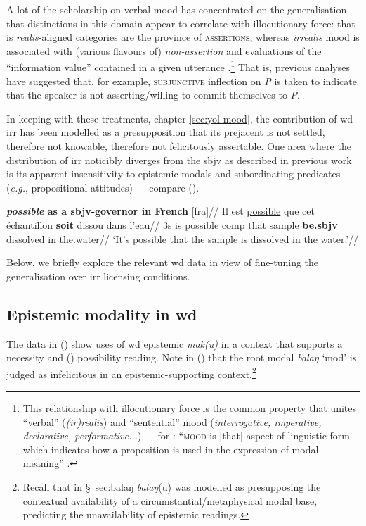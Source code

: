 A lot of the scholarship on verbal mood has concentrated on the generalisation that distinctions in this domain appear to correlate with illocutionary force: that is \textit{realis}-aligned categories are the province of \textsc{assertions}, whereas \textit{irrealis} mood is associated with (various flavours of) \textit{non-assertion} \citep[\textit{e.g.},][]{Bybee1995, Palmer2001} and evaluations of the ``information value'' contained in a given utterance \citep[\textit{e.g.},][]{Lunn1995}.\footnote{This relationship with illocutionary force is the common property that unites ``verbal'' (\textit{(ir)realis}) and ``sentential'' mood (\textit{interrogative, imperative, declarative, performative...}) --- for \citeauthor{Portner2018a}: ``\textsc{mood} is [that] aspect of linguistic form which indicates how a proposition is used in the expression of modal meaning'' \citeyearpar[4]{Portner2018a}.} That is, previous analyses have suggested that, for example, \textsc{subjunctive} inflection on \textit{P} is taken to indicate that the speaker is not asserting/willing to commit themselves to \textit{P}. 

In keeping with these treatments, chapter \ref{sec:yol-mood}, the contribution of \acrshort{wd} \gls{irr} has been modelled as a presupposition that its prejacent is not settled, therefore not knowable, therefore not felicitously assertable. One area where the distribution of \gls{irr} noticibly diverges from the \gls{sbjv} as described in previous work is its apparent insensitivity to epistemic modals and subordinating predicates (\textit{e.g.}, propositional attitudes) --- compare (\nextx).

\pex 
\begingl\glpreamble \textbf{\textit{possible} as a \gls{sbjv}-governor in French }[\gls{fra}]//
\gla Il est \ul{possible} que cet échantillon \textbf{soit} dissou dans l'eau//
\glb 3s is possible \gls{comp} that sample \textbf{be.\gls{sbjv}} dissolved in the.water//
\glft`It's possible that the sample is dissolved in the water.'//\endgl\xe


Below, we briefly explore the relevant \acrshort{wd} data in view of fine-tuning the generalisation over \gls{irr} licensing conditions. 


	\subsection{Epistemic modality in \gls{wd}}
	
	
	The data in (\nextx) show uses of \gls{wd} epistemic \textit{mak(u)} in a context that supports a  necessity and  () possibility reading. Note in () that the root modal \textit{balaŋ} `\gls{mod}' is judged as infelicitous in an epistemic-supporting context.\footnote{Recall that in \S~{sec:balaŋ} \textit{balaŋ}(u) was modelled as presupposing the contextual availability of a circumstantial/metaphysical modal base, predicting the unavailability of epistemic readings.}
	
